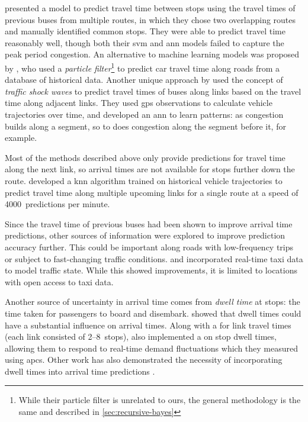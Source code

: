  presented a model to predict travel time between stops using the travel times of previous buses from multiple routes, in which they chose two overlapping routes and manually identified common stops. They were able to predict travel time reasonably well, though both their \gls{svm} and \gls{ann} models failed to capture the peak period congestion. An alternative to machine learning models was proposed by \citet{Chen_2014}, who used a \emph{particle filter}\footnote{While their particle filter is unrelated to ours, the general methodology is the same and described in \cref{sec:recursive-bayes}} to predict car travel time along roads from a database of historical data. Another unique approach by \citet{Julio_2016} used the concept of \emph{traffic shock waves} to predict travel times of buses along links based on the travel time along adjacent links. They used \gls{gps} observations to calculate vehicle trajectories over time, and developed an \gls{ann} to learn patterns: as congestion builds along a segment, so to does congestion along the segment before it, for example.


Most of the methods described above only provide predictions for travel time along the next link, so arrival times are not available for stops further down the route.  developed a \gls{knn} algorithm trained on historical vehicle trajectories to predict travel time along multiple upcoming links for a single route at a speed of 4000~predictions per minute.


Since the travel time of previous buses had been shown to improve arrival time predictions, other sources of information were explored to improve prediction accuracy further. This could be important along roads with low-frequency trips or subject to fast-changing traffic conditions.  and \citet{Ma_2019} incorporated real-time taxi data to model traffic state. While this showed improvements, it is limited to locations with open access to taxi data.


Another source of uncertainty in arrival time comes from \emph{dwell time} at stops: the time taken for passengers to board and disembark.  showed that dwell times could have a substantial influence on arrival times. Along with a \kf{} for link travel times (each link consisted of 2--8~stops), \citeauthor{Shalaby_2004} also implemented a \kf{} on stop dwell times, allowing them to respond to real-time demand fluctuations which they measured using \glspl{apc}. Other work has also demonstrated the necessity of incorporating dwell times into arrival time predictions \citep{Jeong_2005,Cats_2015,Cats_2016}.


